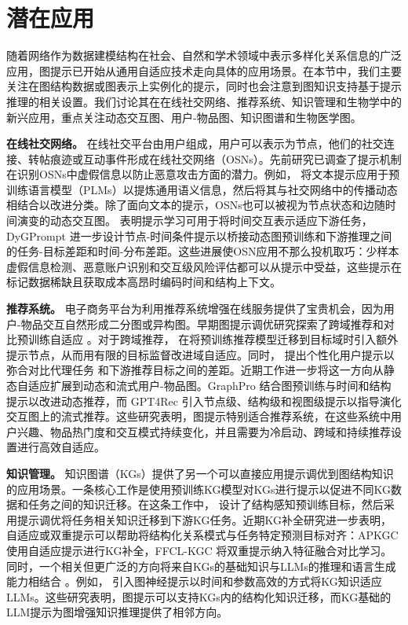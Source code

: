 \section{潜在应用}\label{sec:app}
随着网络作为数据建模结构在社会、自然和学术领域中表示多样化关系信息的广泛应用，图提示已开始从通用自适应技术走向具体的应用场景。在本节中，我们主要关注在图结构数据或图表示上实例化的提示，同时也会注意到图知识支持基于提示推理的相关设置。我们讨论其在在线社交网络、推荐系统、知识管理和生物学中的新兴应用，重点关注动态交互图、用户-物品图、知识图谱和生物医学图。


\textbf{在线社交网络。}
在线社交平台由用户组成，用户可以表示为节点，他们的社交连接、转帖痕迹或互动事件形成在线社交网络（OSNs）。先前研究已调查了提示机制在识别OSNs中虚假信息以防止恶意攻击方面的潜力。例如，\citet{wu2023promptandalign} 将文本提示应用于预训练语言模型（PLMs）以提炼通用语义信息，然后将其与社交网络中的传播动态相结合以改进分类。除了面向文本的提示，OSNs也可以被视为节点状态和边随时间演变的动态交互图。\citet{chen2024prompt} 表明提示学习可用于将时间交互表示适应下游任务，DyGPrompt \cite{yu2025dygprompt} 进一步设计节点-时间条件提示以桥接动态图预训练和下游推理之间的任务-目标差距和时间-分布差距。这些进展使OSN应用不那么投机取巧：少样本虚假信息检测、恶意账户识别和交互级风险评估都可以从提示中受益，这些提示在标记数据稀缺且获取成本高昂时编码时间和结构上下文。


\textbf{推荐系统。}
电子商务平台为利用推荐系统增强在线服务提供了宝贵机会，因为用户-物品交互自然形成二分图或异构图。早期图提示调优研究探索了跨域推荐和对比预训练自适应 \cite{wu2023personalized, hao2024motifbased}。对于跨域推荐，\citet{yi2023contrastive} 在将预训练推荐模型迁移到目标域时引入额外提示节点，从而用有限的目标监督改进域自适应。同时，\citet{yang2023empirical} 提出个性化用户提示以弥合对比代理任务 \cite{wu2021selfsupervised, yu2022are} 和下游推荐目标之间的差距。近期工作进一步将这一方向从静态自适应扩展到动态和流式用户-物品图。GraphPro \cite{yang2024graphpro} 结合图预训练与时间和结构提示以改进动态推荐，而 GPT4Rec \cite{zhang2024gpt4rec} 引入节点级、结构级和视图级提示以指导演化交互图上的流式推荐。这些研究表明，图提示特别适合推荐系统，在这些系统中用户兴趣、物品热门度和交互模式持续变化，并且需要为冷启动、跨域和持续推荐设置进行高效自适应。


\textbf{知识管理。} 知识图谱（KGs）提供了另一个可以直接应用提示调优到图结构知识的应用场景。一条核心工作是使用预训练KG模型对KGs进行提示以促进不同KG数据和任务之间的知识迁移。在这条工作中，\citet{zhang2023structure} 设计了结构感知预训练目标，然后采用提示调优将任务相关知识迁移到下游KG任务。近期KG补全研究进一步表明，自适应或双重提示可以帮助将结构化关系模式与任务特定预测目标对齐：APKGC \cite{maoliniyazi2026apkgc} 使用自适应提示进行KG补全，FFCL-KGC \cite{zhu2026ffclkgc} 将双重提示纳入特征融合对比学习。同时，一个相关但更广泛的方向将来自KGs的基础知识与LLMs的推理和语言生成能力相结合 \cite{wang2023knowledge, robinson2023leveraging, park2023graphguided, zhang2023benchmarking, pan2023unifying}。例如，\citet{tian2023graph} 引入图神经提示以时间和参数高效的方式将KG知识适应LLMs。这些研究表明，图提示可以支持KGs内的结构化知识迁移，而KG基础的LLM提示为图增强知识推理提供了相邻方向。


